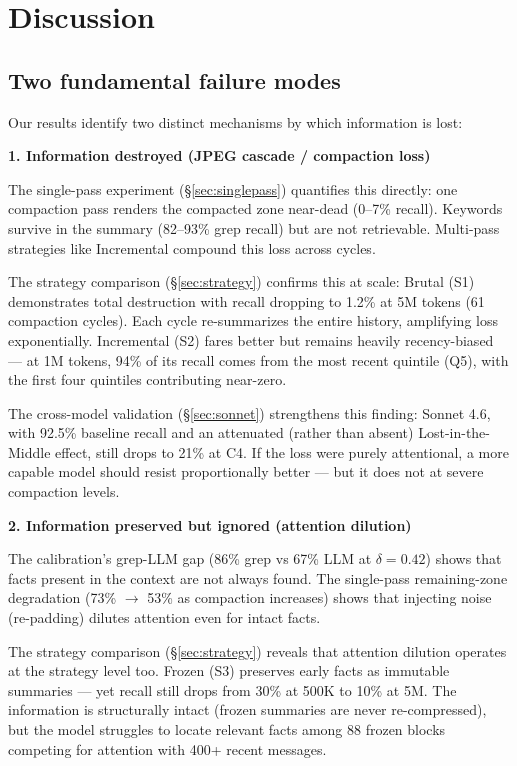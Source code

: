 \section{Discussion}
\label{sec:discussion}

\subsection{Two fundamental failure modes}
\label{sec:failure-modes}

Our results identify two distinct mechanisms by which information is lost:

\textbf{1. Information destroyed (JPEG cascade / compaction loss)}

The single-pass experiment (\S\ref{sec:singlepass}) quantifies this directly: one compaction
pass renders the compacted zone near-dead (0--7\% recall). Keywords survive
in the summary (82--93\% grep recall) but are not retrievable. Multi-pass
strategies like Incremental compound this loss across cycles.

The strategy comparison (\S\ref{sec:strategy}) confirms this at scale: Brutal (S1) demonstrates total destruction
with recall dropping to 1.2\% at 5M tokens (61 compaction cycles). Each
cycle re-summarizes the entire history, amplifying loss exponentially.
Incremental (S2) fares better but remains heavily recency-biased --- at 1M
tokens, 94\% of its recall comes from the most recent quintile (Q5), with
the first four quintiles contributing near-zero.

The cross-model validation (\S\ref{sec:sonnet}) strengthens this finding: Sonnet 4.6, with
92.5\% baseline recall and an attenuated (rather than absent)
Lost-in-the-Middle effect, still drops to 21\% at C4. If the loss were
purely attentional, a more capable model should resist proportionally
better --- but it does not at severe compaction levels.

\textbf{2. Information preserved but ignored (attention dilution)}

The calibration's grep-LLM gap (86\% grep vs 67\% LLM at $\delta=0.42$) shows that facts
present in the context are not always found. The single-pass remaining-zone degradation
(73\% $\to$ 53\% as compaction increases) shows that injecting noise (re-padding)
dilutes attention even for intact facts.

The strategy comparison (\S\ref{sec:strategy}) reveals that attention dilution operates at the strategy level too.
Frozen (S3) preserves early facts as immutable summaries --- yet recall still
drops from 30\% at 500K to 10\% at 5M. The information is structurally intact
(frozen summaries are never re-compressed), but the model struggles to locate
relevant facts among 88 frozen blocks competing for attention with 400+
recent messages.

